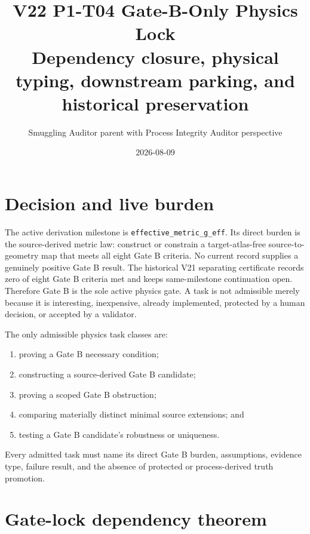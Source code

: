 \documentclass[11pt]{article}
\title{V22 P1-T04 Gate-B-Only Physics Lock\\
\large Dependency closure, physical typing, downstream parking, and historical preservation}
\author{Smuggling Auditor parent with Process Integrity Auditor perspective}
\date{2026-08-09}
\begin{document}
\sloppy
\maketitle

\begin{center}
\end{center}

\section{Decision and live burden}

The active derivation milestone is \texttt{effective\_metric\_g\_eff}. Its
direct burden is the source-derived metric law: construct or constrain a
target-atlas-free source-to-geometry map that meets all eight Gate B criteria.
No current record supplies a genuinely positive Gate B result. The historical
V21 separating certificate records zero of eight Gate B criteria met and keeps
same-milestone continuation open. Therefore Gate B is the sole active physics
gate. A task is not admissible merely because it is interesting, inexpensive,
already implemented, protected by a human decision, or accepted by a
validator.

The only admissible physics task classes are:
\begin{enumerate}
  \item proving a Gate B necessary condition;
  \item constructing a source-derived Gate B candidate;
  \item proving a scoped Gate B obstruction;
  \item comparing materially distinct minimal source extensions; and
  \item testing a Gate B candidate's robustness or uniqueness.
\end{enumerate}
Every admitted task must name its direct Gate B burden, assumptions, evidence
type, failure result, and the absence of protected or process-derived truth
promotion.

\section{Gate-lock dependency theorem}
\end{document}

